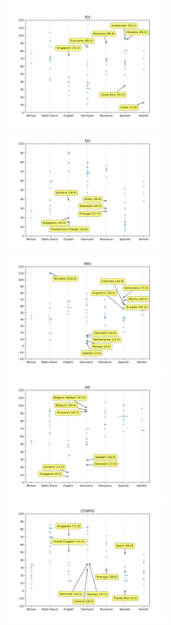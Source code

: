 \documentclass[a4paper,10pt]{article}
\begin{document}
\begin{figure}[H]
       \begin{center}
              \includegraphics[width=6cm]{../figures/pdi.png}
              \includegraphics[width=6cm]{../figures/idv.png}
              \includegraphics[width=6cm]{../figures/mas.png}
              \includegraphics[width=6cm]{../figures/uai.png}
              \includegraphics[width=6cm]{../figures/lto.png}

\end{center}
\end{figure}
\end{document}
